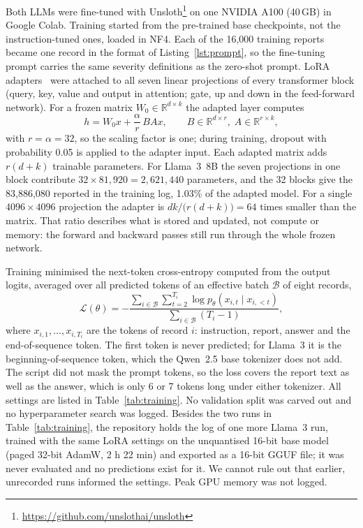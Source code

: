 \documentclass[a4paper,fleqn]{cas-sc}
\begin{document}
Both LLMs were fine-tuned with Unsloth\footnote{\url{https://github.com/unslothai/unsloth}}
on one NVIDIA A100 (40\,GB) in Google Colab. Training started from the pre-trained base
checkpoints, not the instruction-tuned ones, loaded in NF4. Each of the 16,000
training reports became one record in the format of Listing~\ref{lst:prompt}, so the
fine-tuning prompt carries the same severity definitions as the zero-shot prompt. LoRA
adapters~\citep{hu2022lora} were attached to all seven linear projections of every
transformer block (query, key, value and output in attention; gate, up and down in the
feed-forward network). For a frozen matrix $W_0\in\mathbb{R}^{d\times k}$ the adapted
layer computes
\begin{equation}
  h = W_0 x + \frac{\alpha}{r}\, B A x,\qquad B\in\mathbb{R}^{d\times r},\;
  A\in\mathbb{R}^{r\times k},
  \label{eq:lora}
\end{equation}
with $r=\alpha=32$, so the scaling factor is one; during training, dropout with
probability 0.05 is applied to the adapter input. Each adapted matrix adds $r(d+k)$
trainable parameters. For Llama~3~8B the seven projections in one block contribute
$32\times81{,}920=2{,}621{,}440$ parameters, and the 32 blocks give the 83,886,080
reported in the training log, 1.03\% of the adapted model. For a single
$4096\times4096$ projection the adapter is $dk/\big(r(d+k)\big)=64$ times smaller than
the matrix. That ratio describes what is stored and updated, not compute or memory: the
forward and backward passes still run through the whole frozen network.

Training minimised the next-token cross-entropy computed from the output logits,
averaged over all predicted tokens of an effective batch $\mathcal{B}$ of eight records,
\begin{equation}
  \mathcal{L}(\theta) = -\frac{\sum_{i\in\mathcal{B}}\sum_{t=2}^{T_i}
  \log p_\theta\!\left(x_{i,t} \mid x_{i,<t}\right)}{\sum_{i\in\mathcal{B}}(T_i-1)},
  \label{eq:loss}
\end{equation}
where $x_{i,1},\dots,x_{i,T_i}$ are the tokens of record $i$: instruction, report, answer
and the end-of-sequence token. The first token is never predicted; for Llama~3 it is the
beginning-of-sequence token, which the Qwen~2.5 base tokenizer does not add. The script
did not mask the prompt tokens, so the loss covers the report text as well as the
answer, which is only 6 or 7 tokens long under either tokenizer. All settings are listed
in Table~\ref{tab:training}. No validation split was carved out and no hyperparameter
search was logged. Besides the two runs in Table~\ref{tab:training}, the repository holds
the log of one more Llama~3 run, trained with the same LoRA settings on the unquantised
16-bit base model (paged 32-bit AdamW, 2 h 22 min) and exported as a 16-bit GGUF file; it
was never evaluated and no predictions exist for it. We cannot rule out that earlier,
unrecorded runs informed the settings. Peak GPU memory was not logged.
\end{document}
